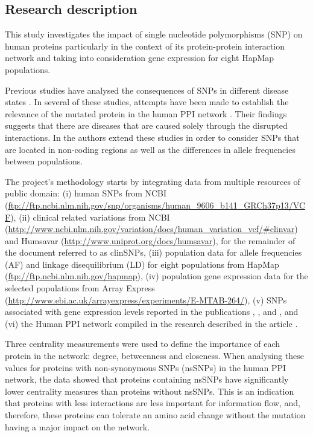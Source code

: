 \subsection{Research description}
This study investigates the impact of single nucleotide polymorphisms (SNP) on human proteins particularly in the context of its protein-protein interaction network and taking into consideration gene expression for eight HapMap populations.

Previous studies have analysed the consequences of SNPs in different disease states \cite{BAU2009}. In several of these studies, attempts have been made to establish the relevance of the mutated protein in the human PPI network \cite{SAU2011}. Their findings suggests that there are diseases that are caused solely through the disrupted interactions. In \cite{HEE2014} the authors extend these studies in order to consider SNPs that are located in non-coding regions as well as the differences in allele frequencies between populations.

The project's methodology starts by integrating data from multiple resources of public domain: (i) human SNPs from NCBI (\url{ftp://ftp.ncbi.nlm.nih.gov/snp/organisms/human_9606_b141_GRCh37p13/VCF}), (ii) clinical related variations from NCBI (\url{http://www.ncbi.nlm.nih.gov/variation/docs/human_variation_vcf/#clinvar}) and Humsavar (\url{http://www.uniprot.org/docs/humsavar}), for the remainder of the document referred to as clinSNPs, (iii) population data for allele frequencies (AF) and linkage disequilibrium (LD) for eight populations from HapMap (\url{ftp://ftp.ncbi.nlm.nih.gov/hapmap}), (iv) population gene expression data for the selected populations from Array Express (\url{http://www.ebi.ac.uk/arrayexpress/experiments/E-MTAB-264/}), (v) SNPs associated with gene expression levels reported in the publications \cite{STR2007}, \cite{LAP2013}, \cite{HAU2014} and \cite{WU2013}, and (vi) the Human PPI network compiled in the research described in the article \cite{RAP2013}.

Three centrality measurements were used to define the importance of each protein in the network: degree, betweenness and closeness. When analysing these values for proteins with non-synonymous SNPs (nsSNPs) in the human PPI network, the data showed that proteins containing nsSNPs have significantly lower centrality measures than proteins without nsSNPs. This is an indication that proteins with less interactions are less important for information flow, and, therefore, these proteins can tolerate an amino acid change without the mutation having a major impact on the network.

